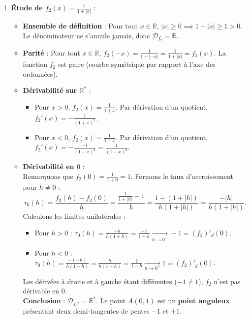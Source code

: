 \documentclass[11pt,a4paper]{article}
\newcommand{\R}{\mathbb{R}}
\begin{document}
\begin{correctionbox}
\begin{enumerate}[label=\textbf{\arabic*.}]
    \item \textbf{Étude de $f_2(x) = \frac{1}{1 + |x|}$} :
    \begin{itemize}
        \item \textbf{Ensemble de définition} : Pour tout $x \in \R$, $|x| \ge 0 \implies 1 + |x| \ge 1 > 0$. Le dénominateur ne s'annule jamais, donc $\mathcal{D}_{f_2} = \R$.
        \item \textbf{Parité} : Pour tout $x \in \R$, $f_2(-x) = \frac{1}{1+|-x|} = \frac{1}{1+|x|} = f_2(x)$. La fonction $f_2$ est paire (courbe symétrique par rapport à l'axe des ordonnées).
        \item \textbf{Dérivabilité sur $\R^*$} :
        \begin{itemize}
            \item Pour $x > 0$, $f_2(x) = \frac{1}{1+x}$. Par dérivation d'un quotient, $f_2'(x) = -\frac{1}{(1+x)^2}$.
            \item Pour $x < 0$, $f_2(x) = \frac{1}{1-x}$. Par dérivation d'un quotient, $f_2'(x) = -\frac{-1}{(1-x)^2} = \frac{1}{(1-x)^2}$.
        \end{itemize}
        \item \textbf{Dérivabilité en $0$} :\\
        Remarquons que $f_2(0) = \frac{1}{1+0} = 1$. Formons le taux d'accroissement pour $h \neq 0$ :
        \[
        \tau_0(h) = \frac{f_2(h) - f_2(0)}{h} = \frac{\frac{1}{1+|h|} - 1}{h} = \frac{1 - (1+|h|)}{h(1+|h|)} = \frac{-|h|}{h(1+|h|)}.
        \]
        Calculons les limites unilatérales :
        \begin{itemize}
            \item Pour $h > 0$ : $\tau_0(h) = \frac{-h}{h(1+h)} = \frac{-1}{1+h} \xrightarrow[h \to 0^+]{} -1 = (f_2)'_d(0)$.
            \item Pour $h < 0$ : $\tau_0(h) = \frac{-(-h)}{h(1-h)} = \frac{h}{h(1-h)} = \frac{1}{1-h} \xrightarrow[h \to 0^-]{} 1 = (f_2)'_g(0)$.
        \end{itemize}
        Les dérivées à droite et à gauche étant différentes ($-1 \neq 1$), $f_2$ n'est pas dérivable en $0$.\\
        \textbf{Conclusion} : $\mathcal{D}_{f_2'} = \R^*$. Le point $A(0, 1)$ est un \textbf{point anguleux} présentant deux demi-tangentes de pentes $-1$ et $+1$.
    \end{itemize}


\end{enumerate}
\end{correctionbox}
\end{document}
